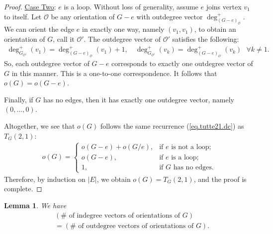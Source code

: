 \documentclass[12pt]{article}
\newtheorem{lemma}[theorem]{Lemma}
\theoremstyle{definition}
\theoremstyle{remark}
\begin{document}
\begin{proof}
    \bigskip
    \noindent\underline{Case Two}: $e$ is a loop. Without loss of generality, assume $e$ joins vertex $v_1$ to itself. Let $\mathcal{O}$ be any orientation of $G-e$ with outdegree vector $\deg_{(G-e)_{\mathcal{O}}}^+$. We can orient the edge $e$ in exactly one way, namely $(v_1,v_1)$, to obtain an orientation of $G$, call it $\mathcal{O}'$. The outdegree vector of $\mathcal{O}'$ satisfies the following: \begin{align*}
        \deg_{G_{\mathcal{O}'}}^+(v_1) = \deg_{(G-e)_{\mathcal{O}}}^+(v_1)+1, \quad
        \deg_{G_{\mathcal{O}'}}^+(v_k) = \deg_{(G-e)_{\mathcal{O}}}^+(v_k) \ \ \ \forall k \neq 1.
    \end{align*} So, each outdegree vector of $G-e$ corresponds to exactly one outdegree vector of $G$ in this manner. %
	This is a one-to-one correspondence. It follows that $o(G)=o(G-e)$. 

    \bigskip
    Finally, if $G$ has no edges, then it has exactly one outdegree vector, namely $(0,\ldots,0)$. 
    
    Altogether, we see that $o(G)$ follows the same recurrence (\ref{eq.tutte21.dc}) as $T_G(2,1)$: \begin{align*}
        o(G) = \begin{cases}
            o(G-e)+o(G/e), & \text{if $e$ is not a loop}; \\
            o(G-e), & \text{if $e$ is a loop}; \\
            1, & \text{if $G$ has no edges.}
        \end{cases} 
    \end{align*}
	Therefore, by induction on $|E|$, we obtain $o(G) = T_G(2,1)$, and the proof is complete.
\end{proof}

\begin{lemma}\label{lem:2=3}
    We have
    \begin{align*}
    & (\# \text{ of indegree vectors of orientations of $G$}) \\
    &= (\# \text{ of outdegree vectors of orientations of $G$}).
    \end{align*}
\end{lemma}
\end{document}
